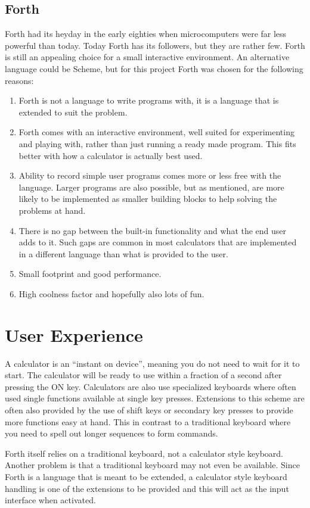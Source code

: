 \documentclass[a4paper]{article}
\begin{document}
\subsection{Forth}
Forth had its heyday in the early eighties when microcomputers were far less powerful than today.
Today Forth has its followers, but they are rather few. Forth is still an appealing choice for a small interactive environment. An alternative language could be Scheme, but for this project Forth was chosen for the following reasons:
\begin{enumerate}
\item Forth is not a language to write programs with, it is a language that is extended to suit the problem.
\item Forth comes with an interactive environment, well suited for experimenting and playing with, rather than just running a ready made program.  This fits better with how a calculator is actually best used.
\item Ability to record simple user programs comes more or less free with the language. Larger programs are also possible, but as mentioned, are more likely to be implemented as smaller building blocks to help solving the problems at hand.
\item There is no gap between the built-in functionality and what the end user adds to it. Such gaps are common in most calculators that are implemented in a different language than what is provided to the user.
\item Small footprint and good performance.
\item High coolness factor and hopefully also lots of fun.
\end{enumerate}

\section{User Experience}
A calculator is an ``instant on device'', meaning you do not need to wait for it to start. The calculator will be ready to use within a fraction of a second after pressing the ON key. Calculators are also use specialized keyboards where often used single functions available at single key presses. Extensions to this scheme are often also provided by the use of shift keys or secondary key presses to provide more functions easy at hand. This in contrast to a traditional keyboard where you need to spell out longer sequences to form commands.

Forth itself relies on a traditional keyboard, not a calculator style keyboard. Another problem is that a traditional keyboard may not even be available. Since Forth is a language that is meant to be extended, a calculator style keyboard handling is one of the extensions to be provided and this will act as the input interface when activated.
\end{document}
